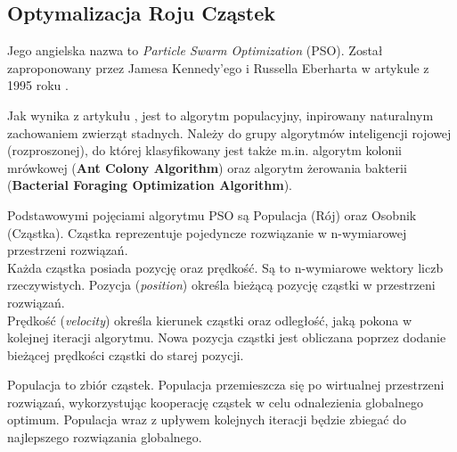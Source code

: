 \subsection{Optymalizacja Roju Cząstek}
Jego angielska nazwa to \textit{Particle Swarm Optimization} (PSO).
Został zaproponowany przez Jamesa Kennedy’ego i Russella Eberharta w artykule z 1995 roku \cite{pso:originalPaper}.

Jak wynika z artykułu \cite{pso:implementingInPython}, jest to algorytm populacyjny, inpirowany naturalnym zachowaniem zwierząt stadnych. Należy do grupy algorytmów inteligencji rojowej (rozproszonej), do której klasyfikowany jest także m.in. algorytm kolonii mrówkowej (\textbf{Ant Colony Algorithm}) oraz
algorytm żerowania bakterii (\textbf{Bacterial Foraging Optimization Algorithm}).

Podstawowymi pojęciami algorytmu PSO są Populacja (Rój) oraz Osobnik (Cząstka).
Cząstka reprezentuje pojedyncze rozwiązanie w n-wymiarowej przestrzeni rozwiązań. \\
Każda cząstka posiada pozycję oraz prędkość. Są to n-wymiarowe wektory liczb rzeczywistych. Pozycja (\textit{position}) określa bieżącą pozycję cząstki w przestrzeni rozwiązań. \\
Prędkość (\textit{velocity}) określa kierunek cząstki oraz odległość, jaką pokona w kolejnej iteracji algorytmu. Nowa pozycja cząstki jest obliczana poprzez dodanie bieżącej prędkości cząstki do starej pozycji.

Populacja to zbiór cząstek. Populacja przemieszcza się po wirtualnej przestrzeni rozwiązań, wykorzystując kooperację cząstek w celu odnalezienia globalnego optimum.
Populacja wraz z upływem kolejnych iteracji będzie zbiegać do najlepszego rozwiązania globalnego.

